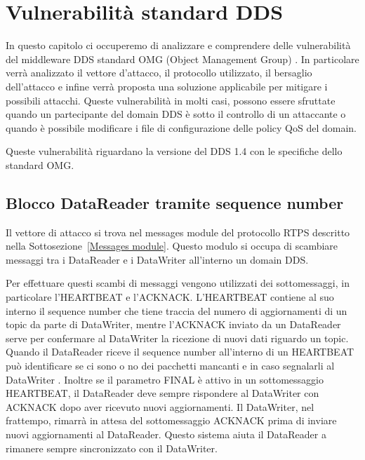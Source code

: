 \chapter{Vulnerabilità standard DDS}


In questo capitolo ci occuperemo di analizzare e comprendere delle vulnerabilità
del middleware DDS standard OMG (Object Management Group) \cite{8469351}. 
In particolare
verrà analizzato il vettore d'attacco, il protocollo utilizzato, il bersaglio
dell'attacco e infine verrà proposta una soluzione applicabile per
mitigare i possibili attacchi. %
Queste vulnerabilità in molti casi, possono essere sfruttate 
quando un partecipante del domain DDS è sotto il controllo di un attaccante
o quando è possibile modificare i file di configurazione delle policy QoS 
del domain.

Queste vulnerabilità riguardano la versione del DDS 1.4 con le specifiche 
dello standard OMG.




\section{Blocco DataReader tramite sequence number}

Il vettore di attacco si trova nel messages module del protocollo RTPS
descritto nella Sottosezione~\ref{Messages module}. Questo modulo
si occupa di scambiare messaggi tra i DataReader e i DataWriter 
all'interno un domain DDS.

Per effettuare questi scambi di messaggi vengono utilizzati dei sottomessaggi,
in particolare l'HEARTBEAT e l'ACKNACK.
L'HEARTBEAT contiene al suo interno il sequence number che tiene traccia 
del numero di aggiornamenti di un topic da parte di DataWriter, mentre
l'ACKNACK inviato da un DataReader
serve per confermare al DataWriter la ricezione di nuovi dati 
riguardo un topic.
Quando il DataReader riceve il sequence number all'interno di un HEARTBEAT
può identificare se ci sono o no dei pacchetti mancanti e in caso segnalarli al
DataWriter \cite{White2017AnII}.
Inoltre se il parametro FINAL è attivo in un sottomessaggio HEARTBEAT, il DataReader 
deve sempre rispondere al DataWriter con ACKNACK dopo aver ricevuto nuovi aggiornamenti.
Il DataWriter, nel frattempo, rimarrà in attesa del sottomessaggio 
ACKNACK prima di 
inviare nuovi aggiornamenti al DataReader.
Questo sistema aiuta il DataReader a rimanere sempre sincronizzato con il 
DataWriter.

